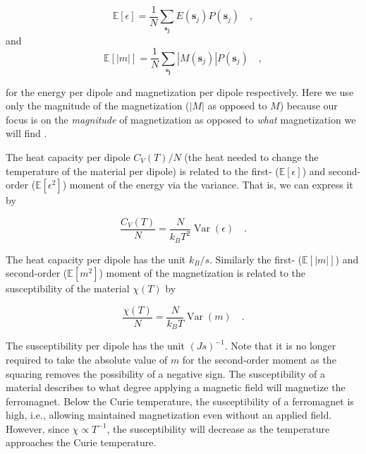 \documentclass[../main_proj4_correct_template.tex]{subfiles}
\begin{document}
\begin{equation}
\label{eq:p4_expectation_energy}
    \mathbb{E}[\epsilon] 
    = \frac{1}{N} \sum\limits_\mathbf{s_j} E(\mathbf{s}_j) P(\mathbf{s}_j)
    \quad ,
\end{equation}
and 
\begin{equation}
    \mathbb{E}[|m|] 
    = \frac{1}{N} \sum\limits_\mathbf{s_j} |M(\mathbf{s}_j) |P(\mathbf{s}_j)
    \quad ,
\end{equation}

\noindent for the energy per dipole and magnetization per dipole respectively. Here we use only the magnitude of the magnetization ($|M|$ as opposed to $M$) because our focus is on the \textit{magnitude} of magnetization as opposed to \textit{what} magnetization we will find \cite{prosjekttbeskrivelse4}. 

The heat capacity per dipole $C_V(T)/N$ (the heat needed to change the temperature of the material per dipole) is related to the first- ($\mathbb{E}[\epsilon]$) and second-order ($\mathbb{E}[\epsilon^{2}]$) moment of the energy via the variance. That is, we can express it by 

\begin{equation}
\label{eq:p4_heat_capacity}
    \frac{C_V(T)}{N} = \frac{N}{k_BT^{2}} \operatorname{Var}(\epsilon)
    \quad .
\end{equation}

\noindent The heat capacity per dipole has the unit $k_B/s$. Similarly the first- ($\mathbb{E}[|m|]$) and second-order ($\mathbb{E}[m^{2}]$) moment of the magnetization is related to the susceptibility of the material $\chi(T)$ by 

\begin{equation}
\label{eq:p4_susceptibility}
    \frac{\chi(T)}{N} = \frac{N}{k_BT} \operatorname{Var}(m) 
    \quad .
\end{equation}

\noindent The susceptibility per dipole has the unit $(Js)^{-1}$. Note that it is no longer required to take the absolute value of $m$ for the second-order moment as the squaring removes the possibility of a negative sign. The susceptibility of a material describes to what degree applying a magnetic field will magnetize the ferromagnet. Below the Curie temperature, the susceptibility of a ferromagnet is high, i.e., allowing maintained magnetization even without an applied field. However, since $\chi \propto T^{-1}$, the susceptibility will decrease as the temperature approaches the Curie temperature.
\end{document}
